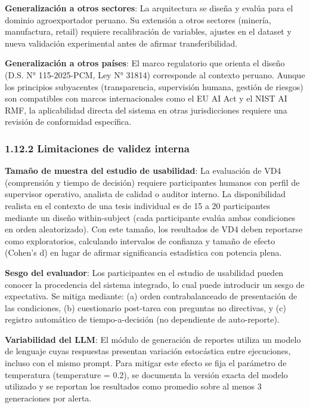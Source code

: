 \textbf{Generalización a otros sectores}: La arquitectura se diseña y
evalúa para el dominio agroexportador peruano. Su extensión a otros
sectores (minería, manufactura, retail) requiere recalibración de
variables, ajustes en el dataset y nueva validación experimental antes
de afirmar transferibilidad.

\textbf{Generalización a otros países}: El marco regulatorio que orienta
el diseño (D.S. N° 115-2025-PCM, Ley N° 31814) corresponde al contexto
peruano. Aunque los principios subyacentes (transparencia, supervisión
humana, gestión de riesgos) son compatibles con marcos internacionales
como el EU AI Act y el NIST AI RMF, la aplicabilidad directa del sistema
en otras jurisdicciones requiere una revisión de conformidad específica.

\subsubsection{1.12.2 Limitaciones de validez
interna}\label{limitaciones-de-validez-interna}

\textbf{Tamaño de muestra del estudio de usabilidad}: La evaluación de
VD4 (comprensión y tiempo de decisión) requiere participantes humanos
con perfil de supervisor operativo, analista de calidad o auditor
interno. La disponibilidad realista en el contexto de una tesis
individual es de 15 a 20 participantes mediante un diseño within-subject
(cada participante evalúa ambas condiciones en orden aleatorizado). Con
este tamaño, los resultados de VD4 deben reportarse como exploratorios,
calculando intervalos de confianza y tamaño de efecto (Cohen's d) en
lugar de afirmar significancia estadística con potencia plena.

\textbf{Sesgo del evaluador}: Los participantes en el estudio de
usabilidad pueden conocer la procedencia del sistema integrado, lo cual
puede introducir un sesgo de expectativa. Se mitiga mediante: (a) orden
contrabalanceado de presentación de las condiciones, (b) cuestionario
post-tarea con preguntas no directivas, y (c) registro automático de
tiempo-a-decisión (no dependiente de auto-reporte).

\textbf{Variabilidad del LLM}: El módulo de generación de reportes
utiliza un modelo de lenguaje cuyas respuestas presentan variación
estocástica entre ejecuciones, incluso con el mismo prompt. Para mitigar
este efecto se fija el parámetro de temperatura (temperature = 0.2), se
documenta la versión exacta del modelo utilizado y se reportan los
resultados como promedio sobre al menos 3 generaciones por alerta.

